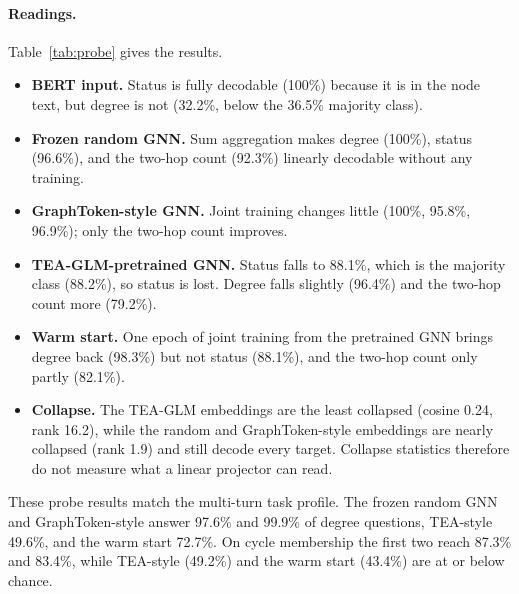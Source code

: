 \documentclass[11pt]{article}
\begin{document}
\begin{table}[t]
\centering
\small
{}
\caption{Linear probes on frozen node embeddings (test-split graphs, accuracy \%). Cos.: mean cosine similarity between nodes of a graph; Rank: effective rank of the embedding covariance. GraphToken-style and warm start are seed 42.}
\label{tab:probe}
\end{table}

\paragraph{Readings.}
Table~\ref{tab:probe} gives the results.
\begin{itemize}[itemsep=1pt]
  \item \textbf{BERT input.} Status is fully decodable (100\%) because it is in the node text, but degree is not (32.2\%, below the 36.5\% majority class).
  \item \textbf{Frozen random GNN.} Sum aggregation makes degree (100\%), status (96.6\%), and the two-hop count (92.3\%) linearly decodable without any training.
  \item \textbf{GraphToken-style GNN.} Joint training changes little (100\%, 95.8\%, 96.9\%); only the two-hop count improves.
  \item \textbf{TEA-GLM-pretrained GNN.} Status falls to 88.1\%, which is the majority class (88.2\%), so status is lost. Degree falls slightly (96.4\%) and the two-hop count more (79.2\%).
  \item \textbf{Warm start.} One epoch of joint training from the pretrained GNN brings degree back (98.3\%) but not status (88.1\%), and the two-hop count only partly (82.1\%).
  \item \textbf{Collapse.} The TEA-GLM embeddings are the least collapsed (cosine 0.24, rank 16.2), while the random and GraphToken-style embeddings are nearly collapsed (rank 1.9) and still decode every target. Collapse statistics therefore do not measure what a linear projector can read.
\end{itemize}
These probe results match the multi-turn task profile.
The frozen random GNN and GraphToken-style answer 97.6\% and 99.9\% of degree questions, TEA-style 49.6\%, and the warm start 72.7\%.
On cycle membership the first two reach 87.3\% and 83.4\%, while TEA-style (49.2\%) and the warm start (43.4\%) are at or below chance.
\end{document}
